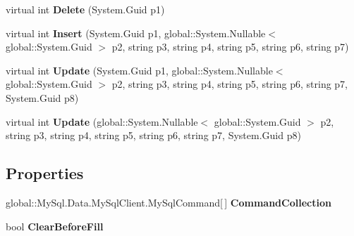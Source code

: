 \begin{DoxyCompactItemize}
\item 
virtual int {\bfseries Delete} (System.\+Guid p1)\hypertarget{class_products_1_1_data_1_1ds_sage_table_adapters_1_1ta_dateilink_ae65123d6316d3d099fe47abc2cab61a4}{}\label{class_products_1_1_data_1_1ds_sage_table_adapters_1_1ta_dateilink_ae65123d6316d3d099fe47abc2cab61a4}

\item 
virtual int {\bfseries Insert} (System.\+Guid p1, global\+::\+System.\+Nullable$<$ global\+::\+System.\+Guid $>$ p2, string p3, string p4, string p5, string p6, string p7)\hypertarget{class_products_1_1_data_1_1ds_sage_table_adapters_1_1ta_dateilink_a809a37d7b0ea319a4e0dd3fc310beb41}{}\label{class_products_1_1_data_1_1ds_sage_table_adapters_1_1ta_dateilink_a809a37d7b0ea319a4e0dd3fc310beb41}

\item 
virtual int {\bfseries Update} (System.\+Guid p1, global\+::\+System.\+Nullable$<$ global\+::\+System.\+Guid $>$ p2, string p3, string p4, string p5, string p6, string p7, System.\+Guid p8)\hypertarget{class_products_1_1_data_1_1ds_sage_table_adapters_1_1ta_dateilink_ae9b77153dc68beeab496c15770386fff}{}\label{class_products_1_1_data_1_1ds_sage_table_adapters_1_1ta_dateilink_ae9b77153dc68beeab496c15770386fff}

\item 
virtual int {\bfseries Update} (global\+::\+System.\+Nullable$<$ global\+::\+System.\+Guid $>$ p2, string p3, string p4, string p5, string p6, string p7, System.\+Guid p8)\hypertarget{class_products_1_1_data_1_1ds_sage_table_adapters_1_1ta_dateilink_a88d3ce7139fe0bf953653a69a850f34e}{}\label{class_products_1_1_data_1_1ds_sage_table_adapters_1_1ta_dateilink_a88d3ce7139fe0bf953653a69a850f34e}

\end{DoxyCompactItemize}
\subsection*{Properties}
\begin{DoxyCompactItemize}
\item 
global\+::\+My\+Sql.\+Data.\+My\+Sql\+Client.\+My\+Sql\+Command\mbox{[}$\,$\mbox{]} {\bfseries Command\+Collection}\hypertarget{class_products_1_1_data_1_1ds_sage_table_adapters_1_1ta_dateilink_a716bfd458f7f20b41c3b657aa654ddf8}{}\label{class_products_1_1_data_1_1ds_sage_table_adapters_1_1ta_dateilink_a716bfd458f7f20b41c3b657aa654ddf8}

\item 
bool {\bfseries Clear\+Before\+Fill}\hypertarget{class_products_1_1_data_1_1ds_sage_table_adapters_1_1ta_dateilink_a16b7f90166e1e541240e60b903d16c2a}{}\label{class_products_1_1_data_1_1ds_sage_table_adapters_1_1ta_dateilink_a16b7f90166e1e541240e60b903d16c2a}

\end{DoxyCompactItemize}


